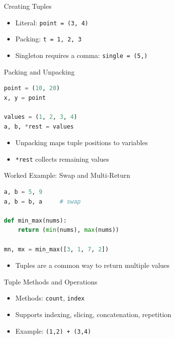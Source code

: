 \documentclass{beamer}
\begin{document}
\begin{frame}[fragile]{Creating Tuples}
  \begin{itemize}[<+->]
    \item Literal: \texttt{point = (3, 4)}
    \item Packing: \texttt{t = 1, 2, 3}
    \item Singleton requires a comma: \texttt{single = (5,)}
  \end{itemize}
\end{frame}

\begin{frame}[fragile]{Packing and Unpacking}
  \begin{lstlisting}[language=Python]
point = (10, 20)
x, y = point

values = (1, 2, 3, 4)
a, b, *rest = values
  \end{lstlisting}
  \begin{itemize}[<+->]
    \item Unpacking maps tuple positions to variables
    \item \texttt{*rest} collects remaining values
  \end{itemize}
\end{frame}

\begin{frame}[fragile]{Worked Example: Swap and Multi-Return}
  \begin{lstlisting}[language=Python]
a, b = 5, 9
a, b = b, a     # swap

def min_max(nums):
    return (min(nums), max(nums))

mn, mx = min_max([3, 1, 7, 2])
  \end{lstlisting}
  \begin{itemize}[<+->]
    \item Tuples are a common way to return multiple values
  \end{itemize}
\end{frame}

\begin{frame}[fragile]{Tuple Methods and Operations}
  \begin{itemize}[<+->]
    \item Methods: \texttt{count}, \texttt{index}
    \item Supports indexing, slicing, concatenation, repetition
    \item Example: \texttt{(1,2) + (3,4)}
  \end{itemize}
\end{frame}
\end{document}
